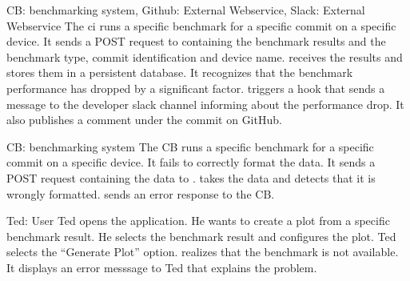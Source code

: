 {CB: \Gls{benchmarking system}, Github: External Webservice, Slack: External Webservice}
{The \acrshort{ci} runs a specific \gls{benchmark} for a specific commit on a specific device. It sends a POST request to \parkview{} containing the \glspl{benchmark result} and the benchmark type, commit identification and device name. \parkview{} receives the results and stores them in a persistent database. It recognizes that the benchmark performance has dropped by a significant factor. \parkview{} triggers a hook that sends a message to the developer slack channel informing about the performance drop. It also publishes a comment under the commit on GitHub.}

{CB: \Gls{benchmarking system}}
{The CB runs a specific \gls{benchmark} for a specific commit on a specific device. It fails to correctly format the data. It sends a POST request containing the data to \parkview{}. \parkview{} takes the data and detects that it is wrongly formatted. \parkview{} sends an \gls{error response} to the CB.}

{Ted: User}
{Ted opens the application. He wants to create a \gls{plot} from a specific \gls{benchmark result}. He selects the \gls{benchmark result} and configures the \gls{plot}. Ted selects the \enquote{Generate Plot} option. \parkview{} realizes that the \gls{benchmark} is not available. It displays an error messsage to Ted that explains the problem.}
